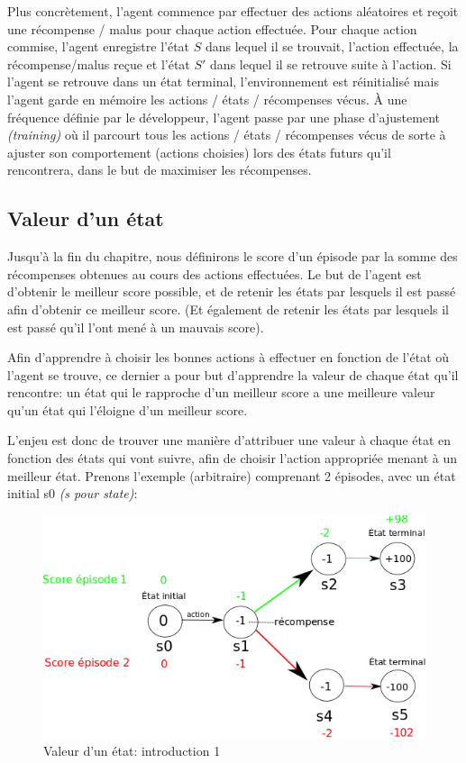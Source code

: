 \documentclass[11pt,a4paper]{report}
\begin{document}
    \par Plus concrètement, l'agent commence par effectuer des actions aléatoires et reçoit une récompense / malus pour chaque action effectuée. Pour chaque action commise, l'agent enregistre l'état $S$ dans lequel il se trouvait, l'action effectuée, la récompense/malus reçue  et l'état $S'$ dans lequel il se retrouve suite à l'action. Si l'agent se retrouve dans un état terminal, l'environnement est réinitialisé mais l'agent garde en mémoire les actions / états / récompenses vécus. À une fréquence définie par le développeur, l'agent passe par une phase d'ajustement \textit{(training)} où il parcourt tous les actions / états / récompenses vécus de sorte à ajuster son comportement (actions choisies) lors des états futurs qu'il rencontrera, dans le but de maximiser les récompenses. 

  \subsection{Valeur d'un état}
  
    \par Jusqu'à la fin du chapitre, nous définirons le score d'un épisode par la somme des récompenses obtenues au cours des actions effectuées. Le but de l'agent est d'obtenir le meilleur score possible, et de retenir les états par lesquels il est passé afin d'obtenir ce meilleur score. (Et également de retenir les états par lesquels il est passé qu'il l'ont mené à un mauvais score). 
    
    \par Afin d'apprendre à choisir les bonnes actions à effectuer en fonction de l'état où l'agent se trouve, ce dernier a pour but d'apprendre la valeur de chaque état qu'il rencontre: un état qui le rapproche d'un meilleur score a une meilleure valeur qu'un état qui l'éloigne d'un meilleur score. 
    
    \par L'enjeu est donc de trouver une manière d'attribuer une valeur à chaque état en fonction des états qui vont suivre, afin de choisir l'action appropriée menant à un meilleur état. Prenons l'exemple (arbitraire) comprenant 2 épisodes, avec un état initial s0 \textit{(s pour state)}: 
    
    \begin{figure}[!h]
    \center
    \includegraphics[scale=0.60]{ressources/introduction_function_value.png}
    \caption{Valeur d'un état: introduction 1}
    \end{figure} 
    
\end{document}
